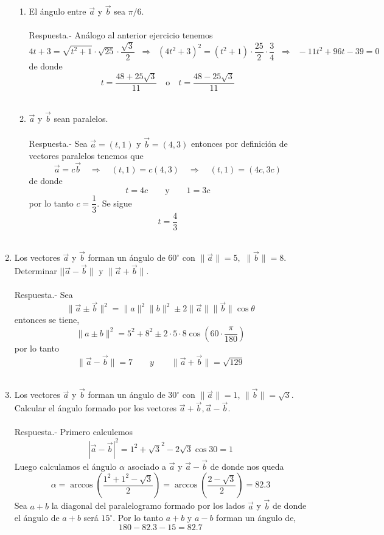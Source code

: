 \begin{enumerate}
\begin{enumerate}[\bfseries a)]
    \item El ángulo entre $\vec{a}$ y $\vec{b}$ sea $\pi/6$.\\\\
	Respuesta.-\; Análogo al anterior ejercicio tenemos $$4t+3=\sqrt{t^2+1}\cdot \sqrt{25}\cdot \dfrac{\sqrt{3}}{2}\;\; \Longrightarrow \; \; (4t^2+3)^2=(t^2+1)\cdot\dfrac{25}{2}\cdot \dfrac{3}{4}\;\; \Longrightarrow \; \; -11t^2+96t-39=0$$
	de donde $$t=\dfrac{48+25\sqrt{3}}{11} \quad \mbox{o} \quad t=\dfrac{48-25\sqrt{3}}{11}$$\\

    \item $\vec{a}$ y $\vec{b}$ sean paralelos.\\\\
	Respuesta.-\; Sea $\vec{a}=(t,1)$ y $\vec{b}=(4,3)$ entonces por definición de vectores paralelos tenemos que $$\vec{a}=c\vec{b} \quad \Longrightarrow \quad (t,1)=c(4,3) \quad \Longrightarrow \quad (t,1)=(4c,3c)$$
	de donde $$t=4c \qquad \mbox{y} \qquad 1=3c$$
	por lo tanto $c=\dfrac{1}{3}$. Se sigue $$t=\dfrac{4}{3}$$\\

\end{enumerate}

\item Los vectores $\vec{a}$ y $\vec{b}$ forman un ángulo de $60^\circ$ con $\|\vec{a}\|=5,$ $\|\vec{b}\|=8$. Determinar $||\vec{a}-\vec{b}\|$ y $\|\vec{a}+\vec{b}\|$.\\\\
    Respuesta.-\; Sea $$\| \vec{a}\pm\vec{b}\|^2=\|a\|^2\|b\|^2 \pm 2\|\vec{a}\|\|\vec{b}\|\cos \theta$$  
    entonces se tiene, $$\|a\pm b\|^2 = 5^2 + 8^2 \pm 2\cdot 5\cdot 8 \cos\left(60\cdot\dfrac{\pi}{180}\right)$$
    por lo tanto $$\|\vec{a}-\vec{b}\| = 7 \qquad y \qquad \|\vec{a}+\vec{b}\| = \sqrt{129}$$\\

\item Los vectores $\vec{a}$ y $\vec{b}$ forman un ángulo de $30^\circ$ con $\|\vec{a}\|=1$, $\|\vec{b}\|=\sqrt{3}$. Calcular el ángulo formado por los vectores $\vec{a}+\vec{b}, \vec{a}-\vec{b}$.\\\\
    Respuesta.-\; Primero calculemos $$|\vec{a}-\vec{b}|^2 = 1^2 + \sqrt{3}^2 - 2\sqrt{3} \cos 30 = 1$$
    Luego calculamos el ángulo $\alpha$ asociado a $\vec{a}$ y $\vec{a}-\vec{b}$ de donde nos queda $$\alpha= \arccos \left(\dfrac{1^2+1^2-\sqrt{3}}{2}\right) = \arccos\left(\dfrac{2-\sqrt{3}}{2}\right) = 82\mbox{.}3$$
    Sea  $a+b$ la diagonal del paralelogramo formado por los lados $\vec{a}$ y $\vec{b}$ de donde el ángulo de $a+b$ será $15^\circ$. Por lo tanto  $a+b$ y  $a-b$ forman un ángulo de, $$180-82\mbox{.}3-15=82\mbox{.}7$$\\


\end{enumerate}
